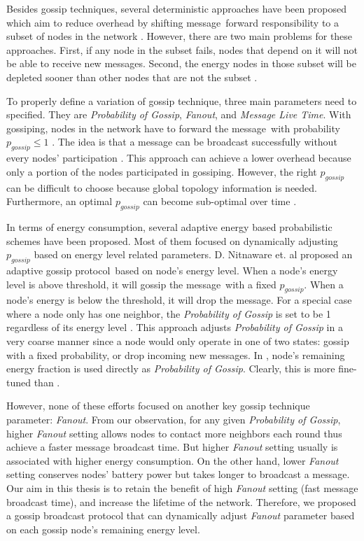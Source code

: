 \documentclass[onehalf,11pt]{beavtex}
\newcommand{\gp}{gossip protocol}
\newcommand{\pog}{Probability of Gossip}
\newcommand{\msgs}{messages}
\newcommand{\msg}{message}
\begin{document}
Besides gossip techniques, several deterministic approaches have been proposed which aim to reduce overhead by shifting \msg ~forward responsibility to a subset of nodes in the network \cite{smart}. However, there are two main problems for these approaches. First, if any node in the subset fails, nodes that depend on it will not be able to receive new \msgs \cite{smart}. Second, the energy nodes in those subset will be depleted sooner than other nodes that are not the subset \cite{smart}.

To properly define a variation of gossip technique, three main parameters need to specified. They are \emph{\pog}, \emph{Fanout}, and \emph{Message Live Time}. With gossiping, nodes in the network have to forward the \msg ~with probability $p_{gossip} \leq 1$ \cite{smart}. The idea is that a message can be broadcast successfully without every nodes' participation \cite{smart}. This approach can achieve a lower overhead because only a portion of the nodes participated in gossiping. However, the right $p_{gossip}$ can be difficult to choose because global topology information is needed. Furthermore, an optimal $p_{gossip}$ can become sub-optimal over time \cite{smart}. 

In terms of energy consumption, several adaptive energy based probabilistic schemes have been proposed. Most of them focused on dynamically adjusting $p_{gossip}$ based on energy level related parameters. D. Nitnaware et. al proposed an adaptive \gp ~based on node's energy level. When a node's energy level is above threshold, it will gossip the \msg ~with a fixed $p_{gossip}$. When a node's energy is below the threshold, it will drop the \msg. For a special case where a node only has one neighbor, the \emph{\pog} is set to be 1 regardless of its energy level \cite{2015survey}. This approach adjusts \emph{\pog} in a very coarse manner since a node would only operate in one of two states: gossip with a fixed probability, or drop incoming new \msgs. In \cite{nitnaware2010energy}, node's remaining energy fraction is used directly as \emph{\pog}. Clearly, this is more fine-tuned than \cite{nitnaware2009performance}.

However, none of these efforts focused on another key gossip technique parameter: \emph{Fanout}. From our observation, for any given \emph{\pog}, higher \emph{Fanout} setting allows nodes to contact more neighbors each round thus achieve a faster message broadcast time. But higher \emph{Fanout} setting usually is associated with higher energy consumption. On the other hand, lower \emph{Fanout} setting conserves nodes' battery power but takes longer to broadcast a \msg. Our aim in this thesis is to retain the benefit of high \emph{Fanout} setting (fast message broadcast time), and increase the lifetime of the network. Therefore, we proposed a gossip broadcast protocol that can dynamically adjust \emph{Fanout} parameter based on each gossip node's remaining energy level.
\end{document}
